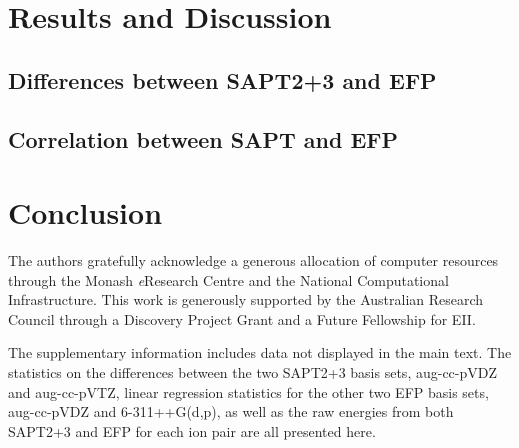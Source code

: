 \documentclass[journal=jctcce]{achemso}
\begin{document}
\section{Results and Discussion}
\label{sec:results}



\subsection{Differences between SAPT2+3 and EFP}
\label{subsec:comparison}


\subsection{Correlation between SAPT and EFP}
\label{subsec:corr-elst}




\section{Conclusion}
\label{sec:conclusion}


\begin{acknowledgement}
The authors gratefully acknowledge a generous allocation of computer resources through the Monash \emph{e}Research
Centre and the National Computational Infrastructure. This
work is generously supported by the Australian Research Council through a Discovery Project Grant and a Future Fellowship for EII.
\end{acknowledgement}

\begin{suppinfo}
    The supplementary information includes data not displayed in the main text.
    The statistics on the differences between the two SAPT2+3 basis sets, aug-cc-pVDZ and aug-cc-pVTZ, linear regression statistics for the other two EFP basis sets, aug-cc-pVDZ and 6-311++G(d,p), as well as the raw energies from both SAPT2+3 and EFP for each ion pair are all presented here.
\end{suppinfo}

%


\clearpage

\end{document}
